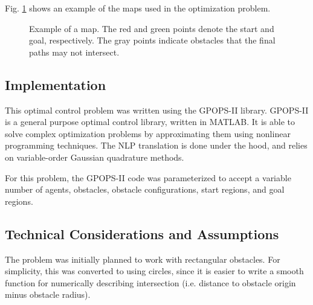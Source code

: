 \documentclass[conference]{IEEEtran}
\begin{document}
Fig. \ref{map} shows an example of the maps used in the optimization problem.
\begin{figure}[h!]
\begin{center}
\caption{Example of a map. The red and green points denote the start and goal, respectively. The gray points indicate obstacles that the final paths may not intersect.}
\label{map}
\end{center}
\end{figure}

\subsection{Implementation}
This optimal control problem was written using the GPOPS-II library. GPOPS-II is a general purpose optimal control library, written in MATLAB\cite{gpops}. It is able to solve complex optimization problems by approximating them using nonlinear programming techniques. The NLP translation is done under the hood, and relies on variable-order Gaussian quadrature methods.

For this problem, the GPOPS-II code was parameterized to accept a variable number of agents, obstacles, obstacle configurations, start regions, and goal regions.

\subsection{Technical Considerations and Assumptions}
The problem was initially planned to work with rectangular obstacles. For simplicity, this was converted to using circles, since it is easier to write a smooth function for numerically describing intersection (i.e. distance to obstacle origin minus obstacle radius). 
\end{document}
